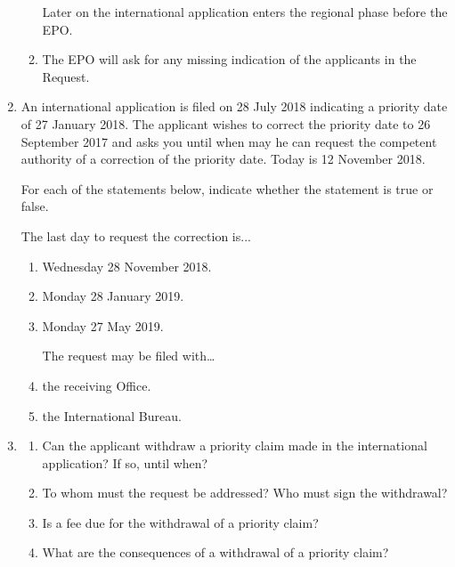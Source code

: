 \documentclass{report}
\begin{document}
\begin{enumerate}[label=\textbf{Question \arabic*}]
\begin{enumerate}[label=(\alph*)]
\vspace{0.5cm}

Later on the international application enters the regional phase before the EPO.


\item The EPO will ask for any missing indication of the applicants in the Request.


    \end{enumerate}


    \item %

An international application is filed on 28 July 2018 indicating a priority date of 27 January 2018. The applicant wishes to correct the priority date to 26 September 2017 and asks you until when may he can request the competent authority of a correction of the priority date. Today is 12 November 2018.

For each of the statements below, indicate whether the statement is true or false.

The last day to request the correction is...


    \begin{enumerate}[label=(\alph*)]
        \item  Wednesday 28 November 2018. 
\item Monday 28 January 2019.
\item Monday 27 May 2019.   
\vspace{0.5cm}

The request may be filed with…
 
        \item the receiving Office.
\item the International Bureau.



    \end{enumerate}

\item %

    \begin{enumerate}[label=(\alph*)]
        \item  Can the applicant withdraw a priority claim made in the international application? If so, until when?
\item To whom must the request be addressed? Who must sign the withdrawal?
\item Is a fee due for the withdrawal of a priority claim? 

\item What are the consequences of a withdrawal of a priority claim?


\end{enumerate}
\end{enumerate}
\end{document}
